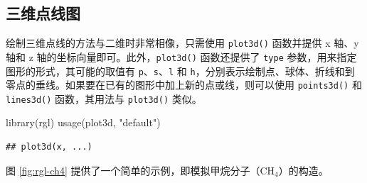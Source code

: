 \documentclass[
  b5paper,
  UTF8,twoside]{book}
\newenvironment{Shaded}{\begin{snugshade}}{\end{snugshade}}
\newcommand{\FunctionTok}[1]{\textcolor[rgb]{0.00,0.00,0.00}{#1}}
\newcommand{\NormalTok}[1]{#1}
\newcommand{\StringTok}[1]{\textcolor[rgb]{0.31,0.60,0.02}{#1}}
\begin{document}
\hypertarget{ux4e09ux7ef4ux70b9ux7ebfux56fe}{%
\subsection{三维点线图}\label{ux4e09ux7ef4ux70b9ux7ebfux56fe}}

绘制三维点线的方法与二维时非常相像，只需使用 \texttt{plot3d()} 函数并提供 x 轴、y 轴和 z 轴的坐标向量即可。此外，\texttt{plot3d()} 函数还提供了 \texttt{type} 参数，用来指定图形的形式，其可能的取值有 \texttt{p}、\texttt{s}、\texttt{l} 和 \texttt{h}，分别表示绘制点、球体、折线和到零点的垂线。如果要在已有的图形中加上新的点或线，则可以使用 \texttt{points3d()} 和 \texttt{lines3d()} 函数，其用法与 \texttt{plot3d()} 类似。

\begin{Shaded}
\begin{Highlighting}[]
\FunctionTok{library}\NormalTok{(rgl)}
\FunctionTok{usage}\NormalTok{(plot3d, }\StringTok{"default"}\NormalTok{)}
\end{Highlighting}
\end{Shaded}

\begin{verbatim}
## plot3d(x, ...)
\end{verbatim}

图 \ref{fig:rgl-ch4} 提供了一个简单的示例，即模拟甲烷分子（\(\mathrm{CH_{4}}\)）的构造。
\end{document}
